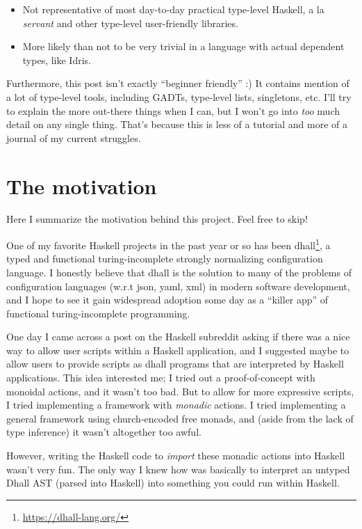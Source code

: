 \documentclass[]{article}
\renewcommand{\href}[2]{#2\footnote{\url{#1}}}
\begin{document}
\begin{itemize}
\tightlist
\item
  Not representative of most day-to-day practical type-level Haskell, a la
  \emph{servant} and other type-level user-friendly libraries.
\item
  More likely than not to be very trivial in a language with actual dependent
  types, like Idris.
\end{itemize}

Furthermore, this post isn't exactly ``beginner friendly'' :) It contains
mention of a lot of type-level tools, including GADTs, type-level lists,
singletons, etc. I'll try to explain the more out-there things when I can, but I
won't go into \emph{too} much detail on any single thing. That's because this is
less of a tutorial and more of a journal of my current struggles.

\section{The motivation}\label{the-motivation}

Here I summarize the motivation behind this project. Feel free to skip!

One of my favorite Haskell projects in the past year or so has been
\href{https://dhall-lang.org/}{dhall}, a typed and functional turing-incomplete
strongly normalizing configuration language. I honestly believe that dhall is
the solution to many of the problems of configuration languages (w.r.t json,
yaml, xml) in modern software development, and I hope to see it gain widespread
adoption some day as a ``killer app'' of functional turing-incomplete
programming.

One day I came across a post on the Haskell subreddit asking if there was a nice
way to allow user scripts within a Haskell application, and I suggested maybe to
allow users to provide scripts as dhall programs that are interpreted by Haskell
applications. This idea interested me; I tried out a proof-of-concept with
monoidal actions, and it wasn't too bad. But to allow for more expressive
scripts, I tried implementing a framework with \emph{monadic} actions. I tried
implementing a general framework using church-encoded free monads, and (aside
from the lack of type inference) it wasn't altogether too awful.

However, writing the Haskell code to \emph{import} these monadic actions into
Haskell wasn't very fun. The only way I knew how was basically to interpret an
untyped Dhall AST (parsed into Haskell) into something you could run within
Haskell.
\end{document}
